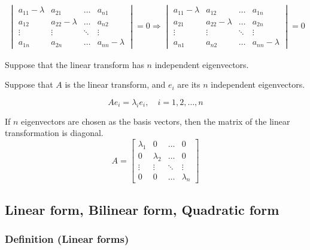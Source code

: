 \begin{enumerate}
\begin{align*}
\begin{vmatrix}
            a_{11} - \lambda & a_{21} & \ldots & a_{n1}\\
            a_{12} & a_{22} - \lambda & \ldots & a_{n2}\\
            \vdots & \vdots & \ddots & \vdots\\
            a_{1n} & a_{2n} & \ldots & a_{nn} - \lambda
        \end{vmatrix} = 0
        \Rightarrow \begin{vmatrix}
            a_{11} - \lambda & a_{12} & \ldots & a_{1n}\\
            a_{21} & a_{22} - \lambda & \ldots & a_{2n}\\
            \vdots & \vdots & \ddots & \vdots\\
            a_{n1} & a_{n2} & \ldots & a_{nn} - \lambda
        \end{vmatrix} = 0
    \end{align*}
\end{enumerate}

















Suppose that the linear transform has $n$ independent eigenvectors.

Suppose that $A$ is the linear transform, and $e_i$ are its $n$ independent eigenvectors.

\[
A e_i = \lambda_i e_i, \quad i = 1, 2, \ldots, n
\]

If $n$ eigenvectors are chosen as the basis vectors, then the matrix of the linear transformation is diagonal.
\begin{equation*}
    A =
    \begin{bmatrix}
        \lambda_1 & 0 & \ldots & 0\\
        0 & \lambda_2 & \ldots & 0\\
        \vdots & \vdots & \ddots & \vdots\\
        0 & 0 & \ldots & \lambda_n
    \end{bmatrix}
\end{equation*}

\subsection{Linear form, Bilinear form, Quadratic form}
\subsubsection{Definition (Linear forms)}

